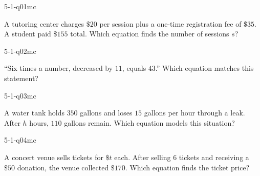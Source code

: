 

\begin{practiceQuestion}{5-1-q01}{mc}
\begin{questionText}
A tutoring center charges $\$20$ per session plus a one-time registration fee of $\$35$. A student paid $\$155$ total. Which equation finds the number of sessions $s$?
\end{questionText}
\end{practiceQuestion}

\begin{practiceQuestion}{5-1-q02}{mc}
\begin{questionText}
``Six times a number, decreased by $11$, equals $43$.'' Which equation matches this statement?
\end{questionText}
\end{practiceQuestion}

\begin{practiceQuestion}{5-1-q03}{mc}
\begin{questionText}
A water tank holds $350$ gallons and loses $15$ gallons per hour through a leak. After $h$ hours, $110$ gallons remain. Which equation models this situation?
\end{questionText}
\end{practiceQuestion}

\begin{practiceQuestion}{5-1-q04}{mc}
\begin{questionText}
A concert venue sells tickets for $\$t$ each. After selling $6$ tickets and receiving a $\$50$ donation, the venue collected $\$170$. Which equation finds the ticket price?
\end{questionText}
\end{practiceQuestion}

